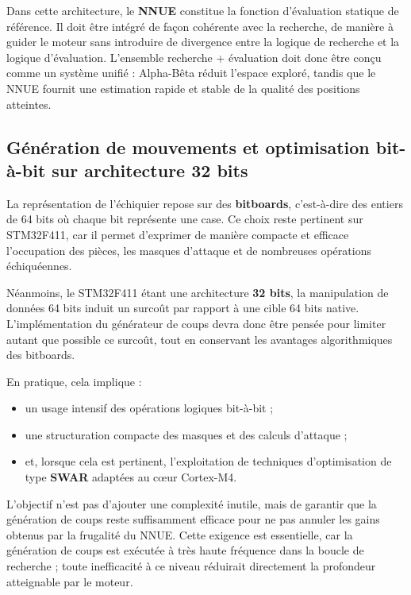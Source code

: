 \documentclass[11pt, a4paper]{article}
\begin{document}
Dans cette architecture, le \textbf{NNUE} constitue la fonction d'évaluation statique de référence. Il doit être intégré de façon cohérente avec la recherche, de manière à guider le moteur sans introduire de divergence entre la logique de recherche et la logique d'évaluation. L'ensemble recherche + évaluation doit donc être conçu comme un système unifié : Alpha-Bêta réduit l'espace exploré, tandis que le NNUE fournit une estimation rapide et stable de la qualité des positions atteintes.

\vspace{0.6em}
\subsection{Génération de mouvements et optimisation bit-à-bit sur architecture 32 bits}
\vspace{0.2em}

La représentation de l'échiquier repose sur des \textbf{bitboards}, c'est-à-dire des entiers de 64 bits où chaque bit représente une case. Ce choix reste pertinent sur STM32F411, car il permet d'exprimer de manière compacte et efficace l'occupation des pièces, les masques d'attaque et de nombreuses opérations échiquéennes.

Néanmoins, le STM32F411 étant une architecture \textbf{32 bits}, la manipulation de données 64 bits induit un surcoût par rapport à une cible 64 bits native. L'implémentation du générateur de coups devra donc être pensée pour limiter autant que possible ce surcoût, tout en conservant les avantages algorithmiques des bitboards.

En pratique, cela implique :
\begin{itemize}
    \item un usage intensif des opérations logiques bit-à-bit ;
    \item une structuration compacte des masques et des calculs d'attaque ;
    \item et, lorsque cela est pertinent, l'exploitation de techniques d'optimisation de type \textbf{SWAR} adaptées au cœur Cortex-M4.
\end{itemize}

L'objectif n'est pas d'ajouter une complexité inutile, mais de garantir que la génération de coups reste suffisamment efficace pour ne pas annuler les gains obtenus par la frugalité du NNUE. Cette exigence est essentielle, car la génération de coups est exécutée à très haute fréquence dans la boucle de recherche ; toute inefficacité à ce niveau réduirait directement la profondeur atteignable par le moteur.
\end{document}
